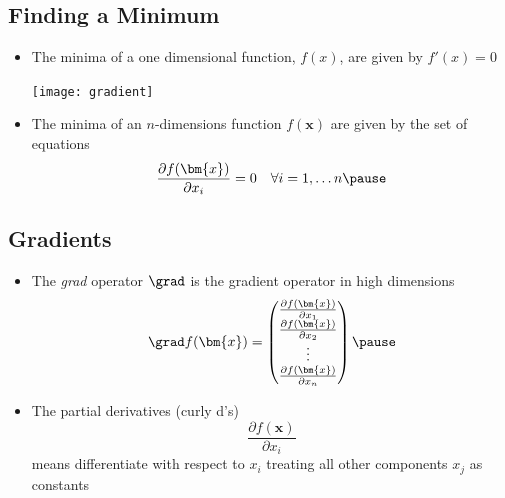 
\begin{slide}
\section[-2]{Finding a Minimum}

\begin{PauseHighLight}
  \begin{itemize}
  \item The minima of a one dimensional function, $f(x)$, are given by
    $f'(x)=0$
    \begin{center}
      \texttt{[image: gradient]}\pause
    \end{center}
  \item The minima of an $n$-dimensions function $f(\bm{x})$ are
    given by the set of equations
    \begin{align*}
      \frac{\partial f(\bm{x})}{\partial x_i}=0 
      \quad \forall i=1,\ldots n\pause
    \end{align*}
  \end{itemize}
\end{PauseHighLight}

\end{slide}


\begin{slide}
  \section[-1]{Gradients}

  \begin{PauseHighLight}

    \begin{itemize}
    \item The \emph{grad} operator $\grad$ is the gradient operator in
      high dimensions
      \begin{displaymath}
        \grad f(\bm{x}) = 
        \begin{pmatrix}
          \frac{\partial f(\bm{x})}{\partial x_1} \\
          \frac{\partial f(\bm{x})}{\partial x_2} \\
          \vdots \\
          \frac{\partial f(\bm{x})}{\partial x_n}
        \end{pmatrix}\pause
      \end{displaymath}
    \item The partial derivatives (curly d's)
      \begin{displaymath}
        \frac{\partial f(\bm{x})}{\partial x_i}
      \end{displaymath}
      means differentiate with respect to $x_i$ treating all other components
      $x_j$ as constants\pause
    \end{itemize}

  \end{PauseHighLight}
\end{slide}

